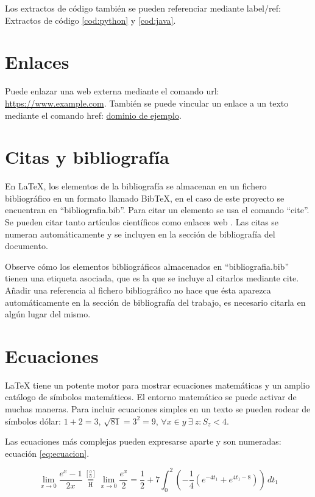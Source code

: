 Los extractos de código también se pueden referenciar mediante label/ref: Extractos de código \ref{cod:python} y \ref{cod:java}.

\section{Enlaces}
Puede enlazar una web externa mediante el comando url: \url{https://www.example.com}. También se puede vincular un enlace a un texto mediante el comando href: \href{https://www.example.com}{dominio de ejemplo}.

\section{Citas y bibliografía}
En LaTeX, los elementos de la bibliografía se almacenan en un fichero bibliográfico en un formato llamado BibTeX, en el caso de este proyecto se encuentran en ``bibliografia.bib''. Para citar un elemento se usa el comando ``cite''. Se pueden citar tanto artículos científicos \cite{borrego2019} como enlaces web \cite{webETSII}. Las citas se numeran automáticamente y se incluyen en la sección de bibliografía del documento.

Observe cómo los elementos bibliográficos almacenados en ``bibliografia.bib'' tienen una etiqueta asociada, que es la que se incluye al citarlos mediante cite. Añadir una referencia al fichero bibliográfico no hace que ésta aparezca automáticamente en la sección de bibliografía del trabajo, es necesario citarla en algún lugar del mismo.

\section{Ecuaciones}
LaTeX tiene un potente motor para mostrar ecuaciones matemáticas y un amplio catálogo de símbolos matemáticos. El entorno matemático se puede activar de muchas maneras. Para incluir ecuaciones simples en un texto se pueden rodear de símbolos dólar: $1 + 2 = 3$, $\sqrt{81} = 3^2 = 9$, $\forall x \in y~\exists~z : S_z < 4$.

Las ecuaciones más complejas pueden expresarse aparte y son numeradas: ecuación \ref{eq:ecuacion}.

\begin{equation}\label{eq:ecuacion}
\lim_{x\to 0}{\frac{e^x-1}{2x}}
 \overset{\left[\frac{0}{0}\right]}{\underset{\mathrm{H}}{=}}
 \lim_{x\to 0}{\frac{e^x}{2}}={\frac{1}{2}}
 +7 \int_0^2
  \left(
    -\frac{1}{4}\left(e^{-4t_1}+e^{4t_1-8}\right)
  \right)\,dt_1
\end{equation}

